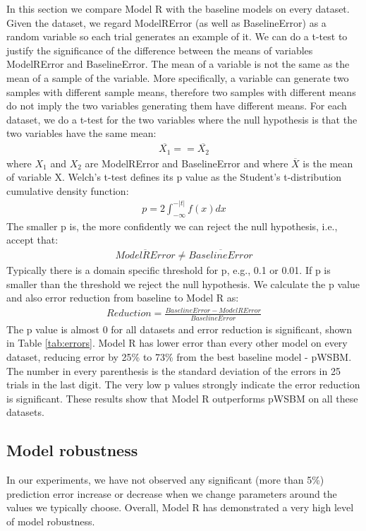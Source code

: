 \documentclass[book,12pt]{WSUThesis}
\theoremstyle{definition}
\begin{document}
In this section we compare Model R with the baseline models on every dataset.
Given the dataset,
we regard ModelRError (as well as BaselineError) as a random variable
so each trial generates an example of it.
We can do a t-test to justify the significance of the difference between the means of variables ModelRError and BaselineError.
The mean of a variable is not the same as the mean of a sample of the variable.
More specifically, a variable can generate two samples with different sample means,
therefore two samples with different means do not imply the two variables generating them have different means.
For each dataset, we do a t-test for the two variables where the null hypothesis is that the two variables have the same mean:
\begin{align*}
\overline{X_1} == \overline{X_2}
\end{align*}
where $ X_1 $ and $ X_2 $ are ModelRError and BaselineError and
where $ \overline{X} $ is the mean of variable X.
Welch's t-test defines its p value as the Student's t-distribution cumulative density function:
\begin{align*}
p = 2 \int_{-\infty}^{-|t|} f(x) dx
\end{align*}
The smaller p is, the more confidently we can reject the null hypothesis, i.e., accept that:
\begin{align*}
\overline{ModelRError} \neq \overline{BaselineError}
\end{align*}
Typically there is a domain specific threshold for p, e.g., 0.1 or 0.01. If p is smaller than the threshold we reject the null hypothesis.
We calculate the p value and also error reduction from baseline to Model R as:
\begin{align*}
Reduction = \frac{BaselineError - ModelRError}{BaselineError}
\end{align*}
The p value is almost 0 for all datasets and error reduction is significant,
shown in Table \ref{tab:errors}.
Model R has lower error than every other model on every dataset,
reducing error by 25\% to 73\% from the best baseline model - pWSBM.
The number in every parenthesis is the standard deviation of the errors in 25 trials in the last digit. The very low p values strongly indicate the error reduction is significant.
These results show that Model R outperforms pWSBM on all these datasets.

\subsection{Model robustness}
In our experiments, we have not observed any significant (more than 5\%)
prediction error increase or decrease when we change parameters around the values
we typically choose.
Overall, Model R has demonstrated a very high level of model robustness.
\end{document}
